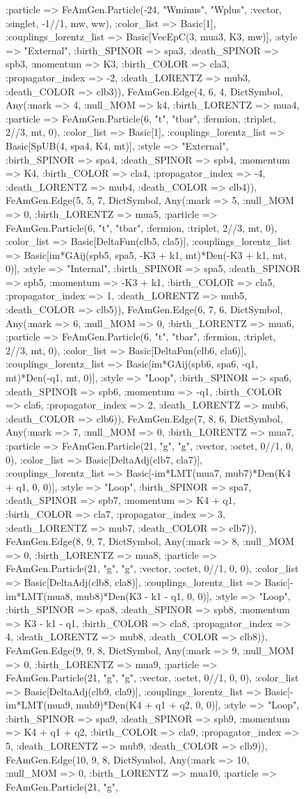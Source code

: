 \documentclass{revtex4}
\begin{document}
\begin{figure}[!htb]
\begin{center}
{:particle => FeAmGen.Particle(-24, "Wminus", "Wplus", :vector, :singlet, -1//1, mw, ww), :color_list => Basic[1], :couplings_lorentz_list => Basic[VecEpC(3, mua3, K3, mw)], :style => "External", :birth_SPINOR => spa3, :death_SPINOR => spb3, :momentum => K3, :birth_COLOR => cla3, :propagator_index => -2, :death_LORENTZ => mub3, :death_COLOR => clb3)), FeAmGen.Edge(4, 6, 4, Dict{Symbol, Any}(:mark => 4, :null_MOM => k4, :birth_LORENTZ => mua4, :particle => FeAmGen.Particle(6, "t", "tbar", :fermion, :triplet, 2//3, mt, 0), :color_list => Basic[1], :couplings_lorentz_list => Basic[SpUB(4, spa4, K4, mt)], :style => "External", :birth_SPINOR => spa4, :death_SPINOR => spb4, :momentum => K4, :birth_COLOR => cla4, :propagator_index => -4, :death_LORENTZ => mub4, :death_COLOR => clb4)), FeAmGen.Edge(5, 5, 7, Dict{Symbol, Any}(:mark => 5, :null_MOM => 0, :birth_LORENTZ => mua5, :particle => FeAmGen.Particle(6, "t", "tbar", :fermion, :triplet, 2//3, mt, 0), :color_list => Basic[DeltaFun(clb5, cla5)], :couplings_lorentz_list => Basic[im*GAij(spb5, spa5, -K3 + k1, mt)*Den(-K3 + k1, mt, 0)], :style => "Internal", :birth_SPINOR => spa5, :death_SPINOR => spb5, :momentum => -K3 + k1, :birth_COLOR => cla5, :propagator_index => 1, :death_LORENTZ => mub5, :death_COLOR => clb5)), FeAmGen.Edge(6, 7, 6, Dict{Symbol, Any}(:mark => 6, :null_MOM => 0, :birth_LORENTZ => mua6, :particle => FeAmGen.Particle(6, "t", "tbar", :fermion, :triplet, 2//3, mt, 0), :color_list => Basic[DeltaFun(clb6, cla6)], :couplings_lorentz_list => Basic[im*GAij(spb6, spa6, -q1, mt)*Den(-q1, mt, 0)], :style => "Loop", :birth_SPINOR => spa6, :death_SPINOR => spb6, :momentum => -q1, :birth_COLOR => cla6, :propagator_index => 2, :death_LORENTZ => mub6, :death_COLOR => clb6)), FeAmGen.Edge(7, 8, 6, Dict{Symbol, Any}(:mark => 7, :null_MOM => 0, :birth_LORENTZ => mua7, :particle => FeAmGen.Particle(21, "g", "g", :vector, :octet, 0//1, 0, 0), :color_list => Basic[DeltaAdj(clb7, cla7)], :couplings_lorentz_list => Basic[-im*LMT(mua7, mub7)*Den(K4 + q1, 0, 0)], :style => "Loop", :birth_SPINOR => spa7, :death_SPINOR => spb7, :momentum => K4 + q1, :birth_COLOR => cla7, :propagator_index => 3, :death_LORENTZ => mub7, :death_COLOR => clb7)), FeAmGen.Edge(8, 9, 7, Dict{Symbol, Any}(:mark => 8, :null_MOM => 0, :birth_LORENTZ => mua8, :particle => FeAmGen.Particle(21, "g", "g", :vector, :octet, 0//1, 0, 0), :color_list => Basic[DeltaAdj(clb8, cla8)], :couplings_lorentz_list => Basic[-im*LMT(mua8, mub8)*Den(K3 - k1 - q1, 0, 0)], :style => "Loop", :birth_SPINOR => spa8, :death_SPINOR => spb8, :momentum => K3 - k1 - q1, :birth_COLOR => cla8, :propagator_index => 4, :death_LORENTZ => mub8, :death_COLOR => clb8)), FeAmGen.Edge(9, 9, 8, Dict{Symbol, Any}(:mark => 9, :null_MOM => 0, :birth_LORENTZ => mua9, :particle => FeAmGen.Particle(21, "g", "g", :vector, :octet, 0//1, 0, 0), :color_list => Basic[DeltaAdj(clb9, cla9)], :couplings_lorentz_list => Basic[-im*LMT(mua9, mub9)*Den(K4 + q1 + q2, 0, 0)], :style => "Loop", :birth_SPINOR => spa9, :death_SPINOR => spb9, :momentum => K4 + q1 + q2, :birth_COLOR => cla9, :propagator_index => 5, :death_LORENTZ => mub9, :death_COLOR => clb9)), FeAmGen.Edge(10, 9, 8, Dict{Symbol, Any}(:mark => 10, :null_MOM => 0, :birth_LORENTZ => mua10, :particle => FeAmGen.Particle(21, "g", }
\end{center}
\end{figure}
\end{document}
